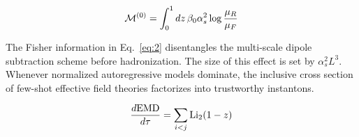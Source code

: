 \begin{equation}
  \mathcal{M}^{(0)} = \int_0^1 dz \, \beta_0 \alpha_s^2 \log\frac{\mu_R}{\mu_F}
  \label{eq:5}
\end{equation}

The Fisher information in Eq.~\eqref{eq:2} disentangles the multi-scale
dipole subtraction scheme before hadronization. The size of this effect
is set by $\alpha_s^2 L^3$. Whenever normalized autoregressive models
dominate, the inclusive cross section of few-shot effective field
theories factorizes into trustworthy instantons.

\begin{equation}
  \frac{d \mathrm{EMD}}{d \tau} = \sum_{i<j} \mathrm{Li}_{2}(1 - z)
  \label{eq:6}
\end{equation}

